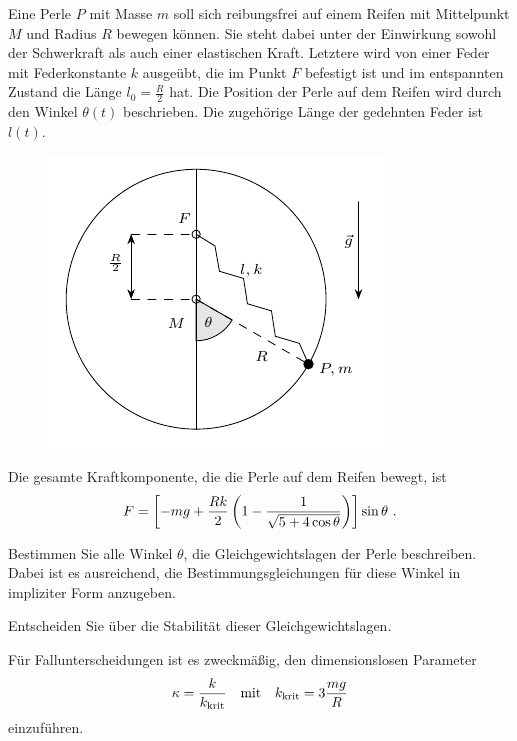 \begin{atiTask}[
  title = Gleichgewichtspunkte und kleine Schwingungen
]
  Eine Perle $P$ mit Masse $m$ soll sich reibungsfrei auf einem Reifen mit Mittelpunkt $M$ und Radius $R$ bewegen können.
  Sie steht dabei unter der Einwirkung sowohl der Schwerkraft als auch einer elastischen Kraft.
  Letztere wird von einer Feder mit Federkonstante $k$ ausgeübt, die im Punkt $F$ befestigt ist und im entspannten Zustand die Länge $l_0 = \frac{R}{2}$ hat.
  Die Position der Perle auf dem Reifen wird durch den Winkel $\theta(t)$ beschrieben.
  Die zugehörige Länge der gedehnten Feder ist $l(t)$.
  \begin{figure}[H]
    \center
    \includegraphics{task-gleichgewichtspunkte_und_kleine_schwingungen-sketch.pdf}
  \end{figure}
  Die gesamte Kraftkomponente, die die Perle auf dem Reifen bewegt, ist
  \[
    F = \left[ -mg + \frac{Rk}{2}\left( 1 - \frac{1}{\sqrt{5 + 4\cos \theta}} \right) \right]\sin \theta \ .
  \]
  \begin{atiSubtasks}
    \item{
      Bestimmen Sie alle Winkel $\theta$, die Gleichgewichtslagen der Perle beschreiben.
      Dabei ist es ausreichend, die Bestimmungsgleichungen für diese Winkel in impliziter Form anzugeben.
    }
    \item{
      Entscheiden Sie über die Stabilität dieser Gleichgewichtslagen.

      \begin{atiNote}
        Für Fallunterscheidungen ist es zweckmäßig, den dimensionslosen Parameter
        \[
          \kappa = \frac{k}{k_{\mathrm{krit}}} \quad \text{mit} \quad k_{\mathrm{krit}} = 3\frac{mg}{R}
        \]
        einzuführen.
      \end{atiNote}
    }
  \end{atiSubtasks}
\end{atiTask}